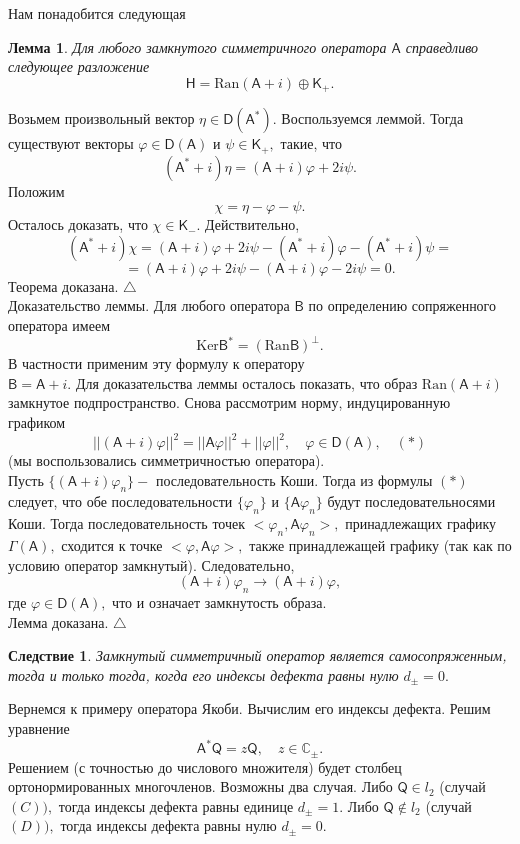 \documentclass[12pt,a4paper]{article}
\theoremstyle{plain}   \newtheorem{Pro}{Задача}
\newtheorem{Cor}{Следствие}
\newtheorem{Lem}{Лемма}
\begin{document}
Нам понадобится следующая
\begin{Lem}
Для любого замкнутого симметричного оператора
$ \mathsf{A} $
справедливо следующее разложение
$$
  \mathsf{H}=\mathrm{Ran}(\mathsf{A}+i)
  \oplus \mathsf{K}_+ .
$$
\end{Lem}
Возьмем произвольный вектор
$ \eta \in \mathsf{D}(\mathsf{A}^{\ast}). $
Воспользуемся леммой. Тогда существуют векторы
$ \varphi \in \mathsf{D}(\mathsf{A}) $
и
$ \psi \in \mathsf{K}_+ , $
такие, что
$$
  (\mathsf{A}^{\ast}+i)\eta =(\mathsf{A}+i)\varphi +2i\psi .
$$
Положим
$$
  \chi =\eta -\varphi -\psi .
$$
Осталось доказать, что
$ \chi \in \mathsf{K}_- . $
Действительно,
$$
 (\mathsf{A}^{\ast}+i)\chi = (\mathsf{A}+i)\varphi +
 2i\psi - (\mathsf{A}^{\ast}+i)\varphi -
 (\mathsf{A}^{\ast}+i)\psi=
$$
$$
 =(\mathsf{A}+i)\varphi +2i\psi -
 (\mathsf{A}+i)\varphi -2i\psi =0.
$$
Теорема доказана.
$ \triangle $
\\
{\Large Доказательство леммы.}
Для любого оператора
$ \mathsf{B} $
по определению сопряженного оператора имеем
$$
  \mathrm{Ker}\mathsf{B}^{\ast}=
  (\mathrm{Ran} \mathsf{B})^{\bot}.
$$
В частности применим эту формулу к оператору\\
$ \mathsf{B}=\mathsf{A}+i . $
Для доказательства леммы осталось показать, что образ
$ \mathrm{Ran}(\mathsf{A}+i) $
замкнутое подпространство.
Снова рассмотрим норму, индуцированную графиком
$$
  ||(\mathsf{A}+i)\varphi ||^2 =
  ||\mathsf{A} \varphi ||^2 +||\varphi ||^2 ,
  \quad \varphi \in \mathsf{D}(\mathsf{A}) ,
  \quad (\ast )
$$
(мы воспользовались симметричностью оператора).
\\
Пусть
$ \{ (\mathsf{A}+i)\varphi _n \} - $
последовательность Коши. Тогда из формулы
$ (\ast ) $
следует, что обе последовательности
$ \{ \varphi _n \} $
и
$ \{ \mathsf{A}\varphi _n \} $
будут последовательносями Коши. Тогда последовательность точек
$ <\varphi _n , \mathsf{A}\varphi _n > , $
принадлежащих графику
$ \Gamma (\mathsf{A}) , $
сходится к точке
$ <\varphi , \mathsf{A}\varphi > , $
также принадлежащей графику (так как по условию оператор
замкнутый). Следовательно,
$$
  (\mathsf{A}+i)\varphi_n \longrightarrow
  (\mathsf{A}+i)\varphi ,
$$
где
$ \varphi \in \mathsf{D}(\mathsf{A}) , $
что и означает замкнутость образа.\\
Лемма доказана.
$ \triangle $
\begin{Cor}
Замкнутый симметричный оператор является самосопряженным,
тогда и только тогда, когда его индексы дефекта
равны нулю
$ d_{\pm}=0. $
\end{Cor}
Вернемся к примеру оператора Якоби. Вычислим его индексы дефекта.
Решим уравнение
$$
  \mathsf{A}^{\ast}\mathsf{Q}=z\mathsf{Q},
  \quad z \in \mathbb{C}_{\pm} .
$$
Решением (с точностью до числового множителя) будет
столбец ортонормированных многочленов. Возможны два случая.
Либо
$ \mathsf{Q} \in l_2 $
(случай
$ (C)), $
тогда индексы дефекта равны единице
$ d_{\pm}=1. $
Либо
$ \mathsf{Q} \not \in l_2 $
(случай
$ (D)), $
тогда индексы дефекта равны нулю
$ d_{\pm}=0 . $
\\
\end{document}
